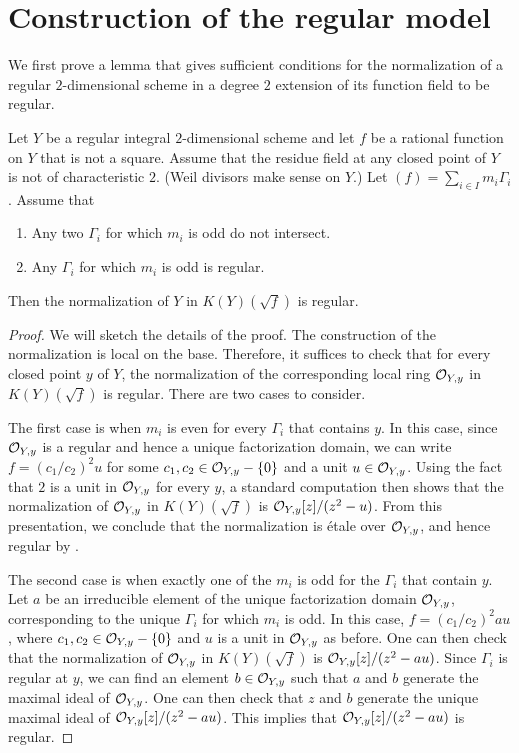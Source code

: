 \section{Construction of the regular model}\label{construct}

We first prove a lemma that gives sufficient conditions for the normalization of a regular $2$-dimensional scheme in a degree $2$ extension of its function field to be regular.

\begin{lemma}\label{useful}
Let $Y$ be a regular integral $2$-dimensional scheme and let $f$ be a rational function on $Y$ that is not a square. Assume that the residue field at any closed point of $Y$ is not of characteristic $2$. (Weil divisors make sense on $Y$.) Let $(f) = \sum_{i \in I} m_i \Gamma_i$. Assume that 
 \begin{enumerate}
  \item Any two $\Gamma_i$ for which $m_i$ is odd do not intersect. 
  \item Any $\Gamma_i$ for which $m_i$ is odd is regular. 
 \end{enumerate}

 Then the normalization of $Y$ in $K(Y)(\sqrt{f})$ is regular.
\end{lemma}
\begin{proof}
We will sketch the details of the proof. The construction of the normalization is local on the base. Therefore, it suffices to check that for every closed point $y$ of $Y$, the normalization of the corresponding local ring $\mathcal{O}_{Y,y}$ in $K(Y)(\sqrt{f})$ is regular. There are two cases to consider. 

The first case is when $m_i$ is even for every $\Gamma_i$ that contains $y$. In this case, since $\mathcal{O}_{Y,y}$ is a regular and hence a unique factorization domain, we can write $f = (c_1/c_2)^2u$ for some $c_1,c_2 \in \mathcal{O}_{Y,y} - \{ 0 \}$ and a unit $u \in \mathcal{O}_{Y,y}$. Using the fact that $2$ is a unit in $\mathcal{O}_{Y,y}$ for every $y$, a standard computation then shows that the normalization of $\mathcal{O}_{Y,y}$ in $K(Y)(\sqrt{f})$ is $\mathcal{O}_{Y,y}[z]/(z^2-u)$. From this presentation, we conclude that the normalization is \'{e}tale over $\mathcal{O}_{Y,y}$, and hence regular by {\cite[Proposition~9]{blr}}. 

The second case is when exactly one of the $m_i$ is odd for the $\Gamma_i$ that contain $y$. Let $a$ be an irreducible element of the unique factorization domain $\mathcal{O}_{Y,y}$, corresponding to the unique $\Gamma_i$ for which $m_i$ is odd. In this case, $f = (c_1/c_2)^2 au$, where $c_1,c_2 \in \mathcal{O}_{Y,y} - \{ 0 \}$ and $u$ is a unit in $\mathcal{O}_{Y,y}$ as before. One can then check that the normalization of $\mathcal{O}_{Y,y}$ in $K(Y)(\sqrt{f})$ is $\mathcal{O}_{Y,y}[z]/(z^2-au)$. Since $\Gamma_i$ is regular at $y$, we can find an element $b \in \mathcal{O}_{Y,y}$ such that $a$ and $b$ generate the maximal ideal of $\mathcal{O}_{Y,y}$. One can then check that $z$ and $b$ generate the unique maximal ideal of $\mathcal{O}_{Y,y}[z]/(z^2-au)$. This implies that $\mathcal{O}_{Y,y}[z]/(z^2-au)$ is regular. 
\end{proof}

